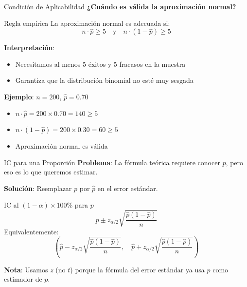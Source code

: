 \documentclass[aspectratio=169, 11pt]{beamer}
\begin{document}
\begin{frame}{Condición de Aplicabilidad}
\textbf{¿Cuándo es válida la aproximación normal?}

\vspace{0.2cm}
\begin{alertblock}{Regla empírica}
La aproximación normal es adecuada si:
\[
n \cdot \hat{p} \geq 5 \quad \text{y} \quad n \cdot (1 - \hat{p}) \geq 5
\]
\end{alertblock}

\vspace{0.3cm}
\textbf{Interpretación}:
\begin{itemize}
  \item Necesitamos al menos 5 éxitos y 5 fracasos en la muestra
  \item Garantiza que la distribución binomial no esté muy sesgada
\end{itemize}

\vspace{0.3cm}
\textbf{Ejemplo}: $n = 200$, $\hat{p} = 0.70$
\begin{itemize}
  \item $n \cdot \hat{p} = 200 \times 0.70 = 140 \geq 5$ \checkmark
  \item $n \cdot (1 - \hat{p}) = 200 \times 0.30 = 60 \geq 5$ \checkmark
  \item Aproximación normal es válida
\end{itemize}
\end{frame}

\begin{frame}{IC para una Proporción}
\textbf{Problema}: La fórmula teórica requiere conocer $p$, pero eso es lo que queremos estimar.

\vspace{0.2cm}
\textbf{Solución}: Reemplazar $p$ por $\hat{p}$ en el error estándar.

\vspace{0.2cm}
\begin{block}{IC al $(1-\alpha) \times 100\%$ para $p$}
\[
\hat{p} \pm z_{\alpha/2} \sqrt{\frac{\hat{p}(1-\hat{p})}{n}}
\]
Equivalentemente:
\[
\left( \hat{p} - z_{\alpha/2} \sqrt{\frac{\hat{p}(1-\hat{p})}{n}}, \quad \hat{p} + z_{\alpha/2} \sqrt{\frac{\hat{p}(1-\hat{p})}{n}} \right)
\]
\end{block}

\textbf{Nota}: Usamos $z$ (no $t$) porque la fórmula del error estándar ya usa $\hat{p}$ como estimador de $p$.
\end{frame}
\end{document}
